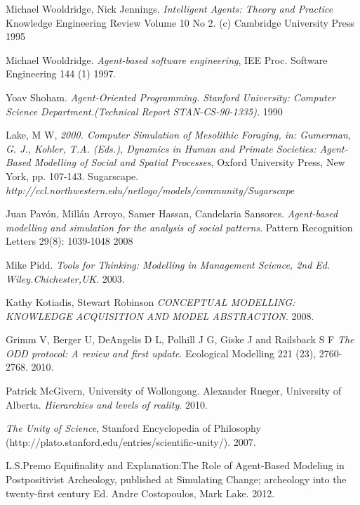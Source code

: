 \documentclass[11pt,oneside,a4paper,openright]{report}
\begin{document}
\begin{thebibliography}{49}
	 Michael Wooldridge, Nick Jennings.
	\emph{Intelligent Agents: Theory and Practice}  Knowledge Engineering Review Volume 10 No 2. (c) Cambridge
	University Press 
	1995

	 Michael Wooldridge.
	\emph{Agent-based software engineering}, IEE Proc. Software Engineering 144 (1) 
	1997.

	Yoav Shoham.
	\emph{Agent-Oriented Programming. Stanford University: Computer Science Department.(Technical Report STAN-CS-90-1335).}
	1990 

	Lake, M W,
	\emph{2000. Computer Simulation of Mesolithic Foraging, in: Gumerman, G. J., Kohler, T.A. (Eds.), Dynamics in Human and Primate Societies: Agent-Based Modelling of Social and Spatial Processes}, Oxford University Press, New York, pp. 107-143.
	Sugarscape.
	\emph{http://ccl.northwestern.edu/netlogo/models/community/Sugarscape}

	Juan Pavón, Millán Arroyo, Samer Hassan, Candelaria Sansores.
	\emph{Agent-based modelling and simulation for the analysis of social patterns}. Pattern Recognition Letters 29(8): 1039-1048 
	2008

	Mike Pidd.
	\emph{Tools for Thinking: Modelling in Management Science, 2nd Ed. Wiley.Chichester,UK}.
	2003.

	Kathy Kotiadis, Stewart Robinson
	\emph{CONCEPTUAL MODELLING: KNOWLEDGE ACQUISITION AND MODEL ABSTRACTION}.
	2008.

	Grimm V, Berger U, DeAngelis D L, Polhill J G, Giske J and Railsback S F 
	\emph{The ODD protocol: A review and first update}. 
	Ecological Modelling 221 (23), 2760-2768.
	2010. 
	

	Patrick McGivern, University of Wollongong.
	Alexander Rueger, University of Alberta.
	\emph{Hierarchies and levels of reality}.
	2010.

	\emph{The Unity of Science}, Stanford Encyclopedia of Philosophy 
	(http://plato.stanford.edu/entries/scientific-unity/).
	2007.

	L.S.Premo
	Equifinality and Explanation:The Role of Agent-Based Modeling in Postpositivist Archeology, 
	published at Simulating Change; archeology into the twenty-first century Ed. Andre Costopoulos, Mark Lake.
	2012.


\end{thebibliography}
\end{document}
